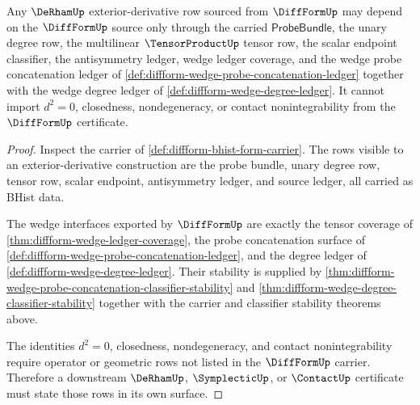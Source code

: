 \begin{theorem}
\label{thm:diffform-derham-input-boundary}
Any $\DeRhamUp$ exterior-derivative row sourced from $\DiffFormUp$ may depend
on the $\DiffFormUp$ source only through the carried $\mathsf{ProbeBundle}$,
the unary degree row, the multilinear $\TensorProductUp$ tensor row, the scalar
endpoint classifier, the antisymmetry ledger, wedge ledger coverage, and the
wedge probe concatenation ledger of
\autoref{def:diffform-wedge-probe-concatenation-ledger} together with the
wedge degree ledger of \autoref{def:diffform-wedge-degree-ledger}. It cannot
import $d^2=0$, closedness, nondegeneracy, or contact nonintegrability from
the $\DiffFormUp$ certificate.
\end{theorem}
\begin{proof}
Inspect the carrier of \autoref{def:diffform-bhist-form-carrier}. The rows
visible to an exterior-derivative construction are the probe bundle, unary
degree row, tensor row, scalar endpoint, antisymmetry ledger, and source
ledger, all carried as BHist data.

The wedge interfaces exported by $\DiffFormUp$ are exactly the tensor coverage
of \autoref{thm:diffform-wedge-ledger-coverage}, the probe concatenation
surface of \autoref{def:diffform-wedge-probe-concatenation-ledger}, and the
degree ledger of \autoref{def:diffform-wedge-degree-ledger}. Their stability
is supplied by
\autoref{thm:diffform-wedge-probe-concatenation-classifier-stability} and
\autoref{thm:diffform-wedge-degree-classifier-stability} together with the
carrier and classifier stability theorems above.

The identities $d^2=0$, closedness, nondegeneracy, and contact
nonintegrability require operator or geometric rows not listed in the
$\DiffFormUp$ carrier. Therefore a downstream $\DeRhamUp$, $\SymplecticUp$, or
$\ContactUp$ certificate must state those rows in its own surface.
\end{proof}
